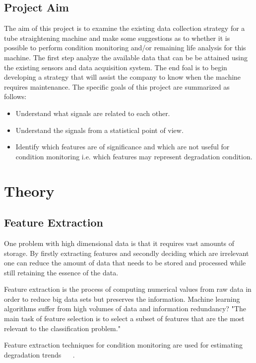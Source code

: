\documentclass{article}
\begin{document}
\subsection{Project Aim}
The aim of this project is to examine the existing data collection strategy for a tube straightening machine and make some suggestions as to whether it is possible to perform condition monitoring and/or remaining life analysis for this machine. The first step analyze the available data that can be be attained using the existing sensors and data acquisition system. The end foal is to begin developing a strategy that will assist the company to know when the machine requires maintenance. The specific goals of this project are summarized as follows:
\begin{itemize}
\item Understand what signals are related to each other.
\item Understand the signals from a statistical point of view.
\item Identify which features are of significance and which are not useful for condition monitoring i.e. which features may represent degradation condition.
\end{itemize}
\clearpage  
\section{Theory}
\subsection{Feature Extraction}
 

One problem with high dimensional data is that it requires vast amounts of storage. By firstly extracting features and secondly deciding which are irrelevant one can reduce the amount of data that needs to be stored and processed while still retaining the essence of the data.

Feature extraction is the process of computing numerical values from raw data in order to reduce big data sets but preserves the information. Machine learning algorithms suffer from high volumes of data and information redundancy?
"The main task of feature selection is to select a subset of features that are the most relevant to the classification problem." ~\cite{ahmed2020condition}

Feature extraction techniques for condition monitoring are used for estimating degradation trends ~\cite{caesarendra2017review} ~\cite{adams2017comparison}.
\end{document}
